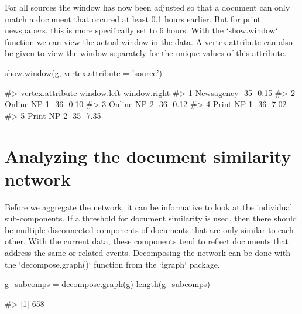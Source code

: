 \begin{Schunk}
\end{Schunk}

For all sources the window has now been adjusted so that a document can only match a document that occured at least 0.1 hours earlier.
But for print newspapers, this is more specifically set to 6 hours.
With the `show.window` function we can view the actual window in the data. 
A vertex.attribute can also be given to view the window separately for the unique values of this attribute.

\begin{Schunk}
\begin{Sinput}
show.window(g, vertex.attribute = 'source')
\end{Sinput}
\begin{Soutput}
#>   vertex.attribute window.left window.right
#> 1       Newsagency         -35        -0.15
#> 2      Online NP 1         -36        -0.10
#> 3      Online NP 2         -36        -0.12
#> 4       Print NP 1         -36        -7.02
#> 5       Print NP 2         -35        -7.35
\end{Soutput}
\end{Schunk}

\section{Analyzing the document similarity network}

Before we aggregate the network, it can be informative to look at the individual sub-components.
If a threshold for document similarity is used, then there should be multiple disconnected components of documents that are only similar to each other.
With the current data, these components tend to reflect documents that address the same or related events. 
Decomposing the network can be done with the `decompose.graph()` function from the `igraph` package.

\begin{Schunk}
\begin{Sinput}
g_subcomps = decompose.graph(g)
length(g_subcomps)
\end{Sinput}
\begin{Soutput}
#> [1] 658
\end{Soutput}
\end{Schunk}

